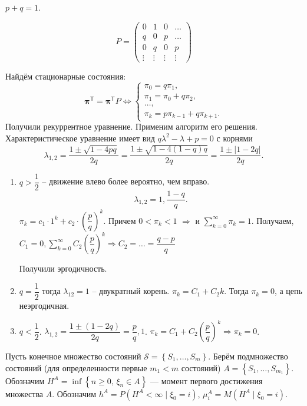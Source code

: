 \begin{ex}
  $p+q=1$.

  \[
    P = \begin{pmatrix}
      0 & 1 & 0 & \dots \\
      q & 0 & p & \dots \\
      0 & q & 0 & p \\
      \vdots & \vdots & \vdots & \vdots
    \end{pmatrix} 
  \]

  Найдём стационарные состояния:
  \[
    \bm\pi^{\mathsf T} = \bm\pi^{\mathsf T} P \Leftrightarrow
    \begin{cases}
      \pi_0 = q \pi_1, \\
      \pi_1 = \pi_0 + q \pi_2, \\
      \dots, \\
      \pi_k = p \pi_{k-1} + q \pi_{k+1}.
    \end{cases}
  \]
  Получили рекуррентное уравнение. Применим алгоритм его решения.
  Характеристическое уравнение имеет вид $q \lambda^2 - \lambda + p = 0$ с
  корнями
  \[
    \lambda_{1, 2} = \dfrac{1\pm \sqrt{1-4pq}}{2q} = \dfrac{1 \pm \sqrt{1 - 4(1-q)q}}{2q}
    = \dfrac{1 \pm |1 - 2q|}{2q}.
  \]
  \begin{enumerate}
    \item $q > \dfrac{1}{2}$ -- движение влево более вероятно, чем вправо.
      \[
        \lambda_{1, 2} = 1, \dfrac{1-q}{q}.
      \]
      $\pi_k = c_1 \cdot 1^k + c_2 \cdot \left( \dfrac{p}{q} \right)^k$.
      Причем $0 < \pi_k < 1$ $\Rightarrow$ и $\sum_{k=0}^\infty \pi_k = 1$.
      Получаем, $C_1 = 0, \sum_{k=0}^\infty C_2 \left( \dfrac{p}{q} \right)^k 
      \Rightarrow C_2 = \dots = \dfrac{q-p}{q}$

      Получили эргодичность.

    \item $q = \dfrac{1}{2}$ тогда $\lambda_{12} = 1$ -- двукратный корень. $\pi_k = C_1 + C_2 k$. 
      Тогда $\pi_k = 0$, а цепь неэргодичная.

    \item $q<\dfrac{1}{2}$. $\lambda_{1, 2} = \dfrac{1 \pm (1-2q)}{2q} = \dfrac{p}{q}, 1$.
      $\pi_k = C_1 + C_2 \left(\dfrac{p}{q}\right)^{k} \Rightarrow \pi_k = 0$.
  \end{enumerate}
\end{ex}

\begin{definition}
  Пусть конечное множество состояний $\mathscr S = \left\{ S_1, \dots, S_m \right\} $. Берём подмножество 
  состояний (для определенности первые $m_1 < m$ состояний)
  $A = \left\{ S_1, \dots, S_{m_1} \right\} $.
  Обозначим $H^A = \inf \left\{ n\geqslant 0,\, \xi_n \in A \right\} $ --- момент первого достижения 
  множества $A$.
  Обозначим $h^A = P(H^A < \infty \mid \xi_0 = i)$,
  $\mu^A_i = M(H^A \mid \xi_0 = i)$.
\end{definition}


